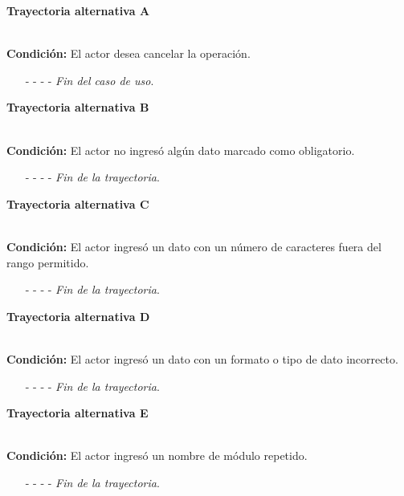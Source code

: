 \hypertarget{CU5-2:TAA}{\textbf{Trayectoria alternativa A}}\\
\noindent \textbf{Condición:} El actor desea cancelar la operación.
\begin{enumerate}
	\UCpaso[\UCactor] Solicita cancelar la operación oprimiendo el botón  de la pantalla 
	\UCpaso[\UCsist] Muestra la pantalla .
	\item[- -] - - {\em {Fin del caso de uso}}.%
\end{enumerate}
\hypertarget{CU5-2:TAB}{\textbf{Trayectoria alternativa B}}\\
\noindent \textbf{Condición:} El actor no ingresó algún dato marcado como obligatorio.
\begin{enumerate}
	\UCpaso[\UCsist] Muestra el mensaje  señalando el campo que presenta el error en la pantalla .
	\UCpaso Regresa al paso \ref{CU5.2-P4} de la trayectoria principal.
	\item[- -] - - {\em {Fin de la trayectoria}}.%
\end{enumerate}
\hypertarget{CU5-2:TAC}{\textbf{Trayectoria alternativa C}}\\
\noindent \textbf{Condición:} El actor ingresó un dato con un número de caracteres fuera del rango permitido.
\begin{enumerate}
	\UCpaso[\UCsist] Muestra el mensaje  señalando el campo que presenta el error en la pantalla .
	\UCpaso Regresa al paso \ref{CU5.2-P4} de la trayectoria principal.
	\item[- -] - - {\em {Fin de la trayectoria}}.%
\end{enumerate}
\hypertarget{CU5-2:TAD}{\textbf{Trayectoria alternativa D}}\\
\noindent \textbf{Condición:} El actor ingresó un dato con un formato o tipo de dato incorrecto.
\begin{enumerate}
	\UCpaso[\UCsist] Muestra el mensaje  señalando el campo que presenta el error en la pantalla .
	\UCpaso Regresa al paso \ref{CU5.2-P4} de la trayectoria principal.
	\item[- -] - - {\em {Fin de la trayectoria}}.
\end{enumerate}
\hypertarget{CU5-2:TAE}{\textbf{Trayectoria alternativa E}}\\
\noindent \textbf{Condición:} El actor ingresó un nombre de módulo repetido.
\begin{enumerate}
	\UCpaso[\UCsist] Muestra el mensaje  señalando el campo que presenta la duplicidad en la pantalla 
	\UCpaso Regresa al paso \ref{CU5.2-P4} de la trayectoria principal.
	\item[- -] - - {\em {Fin de la trayectoria}}.
\end{enumerate}
